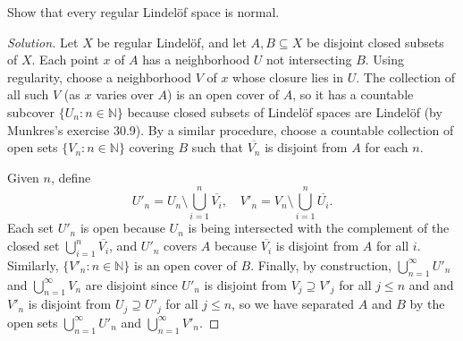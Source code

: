 \documentclass[10pt]{article}
\providecommand{\ol}{\overline}
\providecommand{\NN}{\mathbb N}
\newenvironment{soln}{\begin{proof}[Solution]}{\end{proof}}
\begin{document}
\begin{problem}[Munkres 32.4]
    Show that every regular Lindel\"of space is normal.
\end{problem}

\begin{soln}
    Let $X$ be regular Lindel\"of, and let $A,B\subseteq X$ be
    disjoint closed subsets of $X$.
    Each point $x$ of $A$ has a neighborhood $U$ not intersecting $B$.
    Using regularity, choose a neighborhood $V$ of $x$ whose closure lies in $U$.
    The collection of all such $V$ (as $x$ varies over $A$)
    is an open cover of $A$, so it has a countable subcover $\{U_n : n\in\NN\}$
    because closed subsets of Lindel\"of spaces are Lindel\"of
    (by Munkres's exercise 30.9).
    By a similar procedure, choose a countable collection
    of open sets $\{V_n : n\in\NN\}$ covering $B$
    such that $\ol{V_n}$ is disjoint from $A$ for each $n$.

    Given $n$, define
    \begin{equation*}
	U'_n = U_n\setminus\bigcup_{i=1}^n\ol{V_i},\quad
	V'_n = V_n\setminus\bigcup_{i=1}^n\ol{U_i}.
    \end{equation*}
    Each set $U'_n$ is open because $U_n$ is being intersected with
    the complement of the closed set $\bigcup_{i=1}^n\ol{V_i}$,
    and $U'_n$ covers $A$ because $\ol{V_i}$ is disjoint from $A$ for all $i$.
    Similarly, $\{V'_n : n\in\NN\}$ is an open cover of $B$.
    Finally, by construction, $\bigcup_{n=1}^\infty U'_n$ and
    $\bigcup_{n=1}^\infty V_n$ are disjoint
    since $U'_n$ is disjoint from $V_j\supseteq V'_j$ for all $j\le n$
    and and $V'_n$ is disjoint from $U_j\supseteq U'_j$ for all $j\le n$,
    so we have separated $A$ and $B$ by the open sets $\bigcup_{n=1}^\infty U'_n$
    and $\bigcup_{n=1}^\infty V'_n$.
\end{soln}
\end{document}
